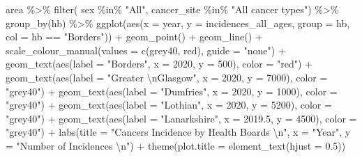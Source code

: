 \documentclass[
]{article}
\newenvironment{Shaded}{\begin{snugshade}}{\end{snugshade}}
\newcommand{\AttributeTok}[1]{\textcolor[rgb]{0.77,0.63,0.00}{#1}}
\newcommand{\DecValTok}[1]{\textcolor[rgb]{0.00,0.00,0.81}{#1}}
\newcommand{\FloatTok}[1]{\textcolor[rgb]{0.00,0.00,0.81}{#1}}
\newcommand{\FunctionTok}[1]{\textcolor[rgb]{0.00,0.00,0.00}{#1}}
\newcommand{\NormalTok}[1]{#1}
\newcommand{\SpecialCharTok}[1]{\textcolor[rgb]{0.00,0.00,0.00}{#1}}
\newcommand{\StringTok}[1]{\textcolor[rgb]{0.31,0.60,0.02}{#1}}
\begin{document}
\begin{Shaded}
\begin{Highlighting}[]
\NormalTok{area }\SpecialCharTok{\%\textgreater{}\%} 
  \FunctionTok{filter}\NormalTok{(}
\NormalTok{         sex }\SpecialCharTok{\%in\%} \StringTok{"All"}\NormalTok{,}
\NormalTok{         cancer\_site }\SpecialCharTok{\%in\%} \StringTok{"All cancer types"}\NormalTok{) }\SpecialCharTok{\%\textgreater{}\%} 
  \FunctionTok{group\_by}\NormalTok{(hb) }\SpecialCharTok{\%\textgreater{}\%} 
  \FunctionTok{ggplot}\NormalTok{(}\FunctionTok{aes}\NormalTok{(}\AttributeTok{x =}\NormalTok{ year, }\AttributeTok{y =}\NormalTok{ incidences\_all\_ages, }\AttributeTok{group =}\NormalTok{ hb, }\AttributeTok{col =}\NormalTok{ hb }\SpecialCharTok{==} \StringTok{"Borders"}\NormalTok{)) }\SpecialCharTok{+}
  \FunctionTok{geom\_point}\NormalTok{() }\SpecialCharTok{+}
  \FunctionTok{geom\_line}\NormalTok{() }\SpecialCharTok{+}
  \FunctionTok{scale\_colour\_manual}\NormalTok{(}\AttributeTok{values =} \FunctionTok{c}\NormalTok{(}\StringTok{\textquotesingle{}grey40\textquotesingle{}}\NormalTok{, }\StringTok{\textquotesingle{}red\textquotesingle{}}\NormalTok{), }\AttributeTok{guide =} \StringTok{"none"}\NormalTok{) }\SpecialCharTok{+}
  \FunctionTok{geom\_text}\NormalTok{(}\FunctionTok{aes}\NormalTok{(}\AttributeTok{label =} \StringTok{"Borders"}\NormalTok{, }\AttributeTok{x =} \DecValTok{2020}\NormalTok{, }\AttributeTok{y =} \DecValTok{500}\NormalTok{), }\AttributeTok{color =} \StringTok{"red"}\NormalTok{) }\SpecialCharTok{+}
  \FunctionTok{geom\_text}\NormalTok{(}\FunctionTok{aes}\NormalTok{(}\AttributeTok{label =} \StringTok{"Greater }\SpecialCharTok{\textbackslash{}n}\StringTok{Glasgow"}\NormalTok{, }\AttributeTok{x =} \DecValTok{2020}\NormalTok{, }\AttributeTok{y =} \DecValTok{7000}\NormalTok{), }\AttributeTok{color =} \StringTok{"grey40"}\NormalTok{) }\SpecialCharTok{+}
  \FunctionTok{geom\_text}\NormalTok{(}\FunctionTok{aes}\NormalTok{(}\AttributeTok{label =} \StringTok{"Dumfries"}\NormalTok{, }\AttributeTok{x =} \DecValTok{2020}\NormalTok{, }\AttributeTok{y =} \DecValTok{1000}\NormalTok{), }\AttributeTok{color =} \StringTok{"grey40"}\NormalTok{) }\SpecialCharTok{+}
  \FunctionTok{geom\_text}\NormalTok{(}\FunctionTok{aes}\NormalTok{(}\AttributeTok{label =} \StringTok{"Lothian"}\NormalTok{, }\AttributeTok{x =} \DecValTok{2020}\NormalTok{, }\AttributeTok{y =} \DecValTok{5200}\NormalTok{), }\AttributeTok{color =} \StringTok{"grey40"}\NormalTok{) }\SpecialCharTok{+}
  \FunctionTok{geom\_text}\NormalTok{(}\FunctionTok{aes}\NormalTok{(}\AttributeTok{label =} \StringTok{"Lanarkshire"}\NormalTok{, }\AttributeTok{x =} \FloatTok{2019.5}\NormalTok{, }\AttributeTok{y =} \DecValTok{4500}\NormalTok{), }\AttributeTok{color =} \StringTok{"grey40"}\NormalTok{) }\SpecialCharTok{+}
  \FunctionTok{labs}\NormalTok{(}\AttributeTok{title =} \StringTok{"Cancers Incidence by Health Boards }\SpecialCharTok{\textbackslash{}n}\StringTok{"}\NormalTok{,}
       \AttributeTok{x =} \StringTok{"Year"}\NormalTok{,}
       \AttributeTok{y =} \StringTok{"Number of Incidences }\SpecialCharTok{\textbackslash{}n}\StringTok{"}\NormalTok{) }\SpecialCharTok{+}
  \FunctionTok{theme}\NormalTok{(}\AttributeTok{plot.title =} \FunctionTok{element\_text}\NormalTok{(}\AttributeTok{hjust =} \FloatTok{0.5}\NormalTok{))}
\end{Highlighting}
\end{Shaded}
\end{document}
